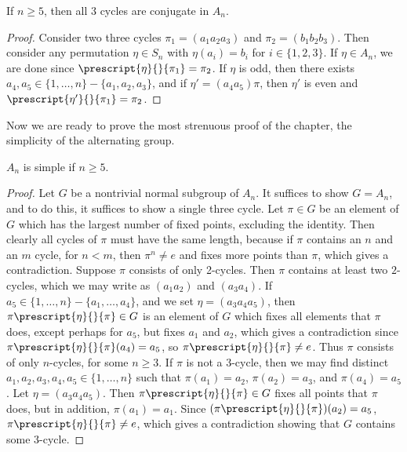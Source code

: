 \begin{corollary}
    If $n \geq 5$, then all $3$ cycles are conjugate in $A_n$.
\end{corollary}
\begin{proof}
    Consider two three cycles $\pi_1 = (a_1 a_2 a_3)$ and $\pi_2 = (b_1 b_2 b_3)$. Then consider any permutation $\eta \in S_n$ with $\eta(a_i) = b_i$ for $i \in \{ 1, 2, 3 \}$. If $\eta \in A_n$, we are done since $\prescript{\eta}{}{\pi_1} = \pi_2$. If $\eta$ is odd, then there exists $a_4, a_5 \in \{ 1, \dots, n \} - \{ a_1, a_2, a_3 \}$, and if $\eta' = (a_4 a_5) \pi$, then $\eta'$ is even and $\prescript{\eta'}{}{\pi_1} = \pi_2$.
\end{proof}

Now we are ready to prove the most strenuous proof of the chapter, the simplicity of the alternating group.

\begin{lemma} $A_n$ is simple if $n \geq 5$. \end{lemma}
\begin{proof}
    Let $G$ be a nontrivial normal subgroup of $A_n$. It suffices to show $G = A_n$, and to do this, it suffices to show a single three cycle. Let $\pi \in G$ be an element of $G$ which has the largest number of fixed points, excluding the identity. Then clearly all cycles of $\pi$ must have the same length, because if $\pi$ contains an $n$ and an $m$ cycle, for $n < m$, then $\pi^n \neq e$ and fixes more points than $\pi$, which gives a contradiction. Suppose $\pi$ consists of only 2-cycles. Then $\pi$ contains at least two $2$-cycles, which we may write as $(a_1 a_2)$ and $(a_3 a_4)$. If $a_5 \in \{ 1, \dots, n \} - \{ a_1, \dots, a_4 \}$, and we set $\eta = (a_3 a_4 a_5)$, then $\pi \prescript{\eta}{}{\pi} \in G$ is an element of $G$ which fixes all elements that $\pi$ does, except perhaps for $a_5$, but fixes $a_1$ and $a_2$, which gives a contradiction since $\pi \prescript{\eta}{}{\pi}(a_4) = a_5$, so $\pi \prescript{\eta}{}{\pi} \neq e$. Thus $\pi$ consists of only $n$-cycles, for some $n \geq 3$. If $\pi$ is not a $3$-cycle, then we may find distinct $a_1, a_2, a_3, a_4, a_5 \in \{ 1, \dots, n \}$ such that $\pi(a_1) = a_2$, $\pi(a_2) = a_3$, and $\pi(a_4) = a_5$. Let $\eta = (a_3 a_4 a_5)$. Then $\pi \prescript{\eta}{}{\pi} \in G$ fixes all points that $\pi$ does, but in addition, $\pi(a_1) = a_1$. Since $(\pi \prescript{\eta}{}{\pi})(a_2) = a_5$, $\pi \prescript{\eta}{}{\pi} \neq e$, which gives a contradiction showing that $G$ contains some 3-cycle.
\end{proof}

